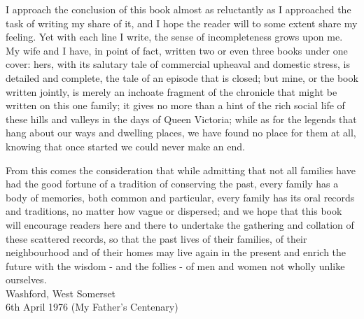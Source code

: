 
I approach the conclusion of this book almost as reluctantly as I approached the task of writing my share of it, and I hope the reader will to some extent share my feeling. Yet with each line I write, the sense of incompleteness grows upon me. My wife and I have, in point of fact, written two or even three books under one cover: hers, with its salutary tale of commercial upheaval and domestic stress, is detailed and complete, the tale of an episode that is closed; but mine, or the book written jointly, is merely an inchoate fragment of the chronicle that might be written on this one family; it gives no more than a hint of the rich social life of these hills and valleys in the days of Queen Victoria; while as for the legends that hang about our ways and dwelling places, we have found no place for them at all, knowing that once started we could never make an end.

From this comes the consideration that while admitting that not all families have had the good fortune of a tradition of conserving the past, every family has a body of memories, both common and particular, every family has its oral records and traditions, no matter how vague or dispersed; and we hope that this book will encourage readers here and there to undertake the gathering and collation of these scattered records, so that the past lives of their families, of their neighbourhood and of their homes may live again in the present and enrich the future with the wisdom - and the follies - of men and women not wholly unlike ourselves. \\

Washford, West Somerset \\
6th April 1976 (My Father's Centenary)
